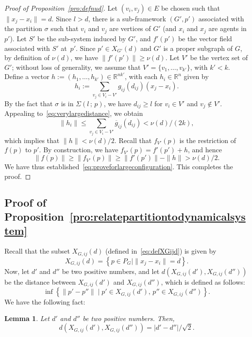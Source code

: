 \documentclass[10pt,twocolumn,twoside]{IEEEtran}
\newtheorem{lem}{Lemma}
\newcommand{\R}{\mathbb{R}}
\newcommand{\ol}{\overline}
\renewcommand{\(}{\left (}
\renewcommand{\)}{\right )}
\renewcommand{\;}{\,;\,}
\begin{document}
\begin{proof}[Proof of Proposition~\ref{pro:defnud}]
Let $(v_i, v_j) \in E$  be chosen such that $\|x_j - x_i\| = d$. Since $l> d$, there is a sub-framework $(G',p')$ associated with the partition $\sigma$ such that 
 $v_{i}$ and $v_j$ are vertices of  $G'$ (and $x_i$ and $x_j$ are agents in $p'$). 
Let $S'$ be the sub-system induced by $G'$, and $f'(p')$ be the vector field associated with $S'$ at~$p'$. 
Since $p'\in X_{G'}(d)$ and $G'$ is a proper subgraph of $G$, by definition of $\nu(d)$, we have $\|f'(p')\| \ge \nu(d)$. 
Let $V'$ be the vertex set of $G'$; without loss of generality, we assume that $V'= \{v_1,\ldots, v_{k'}\}$, with $k' < k$. 
Define a vector 
$
h := \(h_1,\ldots, h_{k'}\) \in \R^{nk'} 
$, 
with each $h_i\in \R^n$ given by
$$
h_i := \sum_{v_j\in V_i - V'} g_{ij}(d_{ij}) (x_j - x_i). 
$$
By the fact that  $\sigma$ is in $\Sigma(l\; p)$, we have $d_{ij} \ge l$ for $v_i\in V'$ and $v_j\notin V'$. Appealing to~\eqref{eq:verylargedistance}, we obtain 
$$
\|h_i\| \le \sum_{v_j\in V_i - V'} \ol g_{ij}(d_{ij}) < \nu(d) / (2k), 
$$
which implies that $\|h\| < \nu(d) / 2$. 
Recall that $f_{V'}(p)$ is the restriction of $f(p)$ to $p'$. By construction, we have
$
f_{V'}(p) =  f'(p') + h 
$, and hence 
$$
\|f(p)\| \ge \|f_{V'}(p)\| \ge \|f'(p')\| - \|h\| > \nu(d) /2.
$$
We have thus established~\eqref{eq:proveforlargeconfiguration}. This completes the proof. 
\end{proof}
 




\subsection{Proof of Proposition~\ref{pro:relatepartitiontodynamicalsystem}}
Recall that the subset $X_{G,ij}(d)$ (defined in~\eqref{eq:defXGijd}) is given by  
$$
X_{G,ij}(d) = \left\{ p\in P_G \mid \|x_j - x_i\| = d \right\}. 
$$
Now, let $d'$ and $d''$ be two positive numbers, and let $d(X_{G,ij}(d'),  X_{G,ij}(d''))$ be the distance between $X_{G,ij}(d')$ and $X_{G,ij}(d'')$, which is defined as follows: 
$$
\inf\left\{ \|p' - p''\| \mid p'\in X_{G,ij}(d'), \, p''\in X_{G,ij}(d'') \right\}. 
$$
We have the following fact:

\begin{lem}\label{lem:boundedbelowdistance}
Let $d'$ and $d''$ be two positive numbers. Then, 
$$
d(X_{G,ij}(d'), X_{G,ij}(d'')) = |d' - d''|/ \sqrt{2}. 
$$\,
\end{lem}
\end{document}
